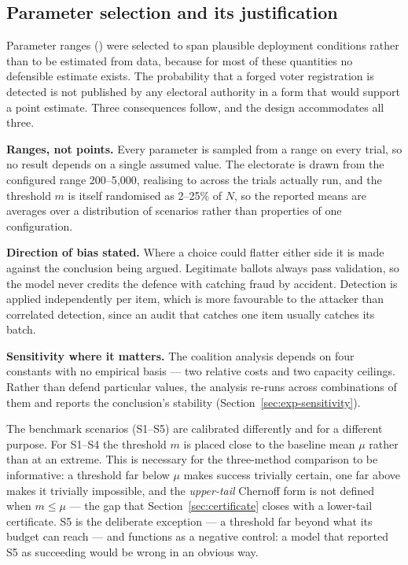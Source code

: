 \subsection{Parameter selection and its justification}
\label{sec:method-params}

Parameter ranges () were selected to span
plausible deployment conditions rather than to be estimated from data,
because for most of these quantities no defensible estimate exists. The
probability that a forged voter registration is detected is not
published by any electoral authority in a form that would support a
point estimate. Three consequences follow, and the design accommodates
all three.

\textbf{Ranges, not points.} Every parameter is sampled from a range on
every trial, so no result depends on a single assumed value. The
electorate is drawn from the configured range 200--5{,}000, realising
\ElectorateMin{} to \ElectorateMax{} across the trials actually run, and the
threshold $m$ is itself randomised as 2--25\% of $N$, so the reported
means are averages over a distribution of scenarios rather than
properties of one configuration.

\textbf{Direction of bias stated.} Where a choice could flatter either
side it is made against the conclusion being argued. Legitimate ballots
always pass validation, so the model never credits the defence with
catching fraud by accident. Detection is applied independently per
item, which is more favourable to the attacker than correlated
detection, since an audit that catches one item usually catches its
batch.

\textbf{Sensitivity where it matters.} The coalition analysis depends
on four constants with no empirical basis --- two relative costs and
two capacity ceilings. Rather than defend particular values, the
analysis re-runs across \SensitivityConfigs{} combinations of them and
reports the conclusion's stability
(Section~\ref{sec:exp-sensitivity}).

The benchmark scenarios (S1--S5) are calibrated differently and for a
different purpose. For S1--S4 the threshold $m$ is placed close to the
baseline mean $\mu$ rather than at an extreme. This is necessary for
the three-method comparison to be informative: a threshold far below
$\mu$ makes success trivially certain, one far above makes it trivially
impossible, and the \emph{upper-tail} Chernoff form is not defined
when $m \leq \mu$ --- the gap that Section~\ref{sec:certificate}
closes with a lower-tail certificate. S5 is the deliberate exception --- a threshold far beyond what
its budget can reach --- and functions as a negative control: a model
that reported S5 as succeeding would be wrong in an obvious way.

